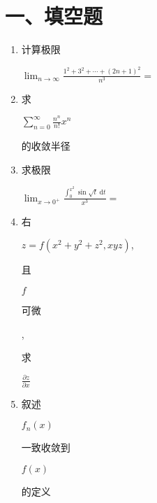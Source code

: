 \documentclass[10pt]{article}
\begin{document}
\section{一、填空题}
\begin{enumerate}
  \item \begin{CJK}{UTF8}{mj}计算极限\end{CJK} $\lim _{n \rightarrow \infty} \frac{1^{2}+3^{2}+\cdots+(2 n+1)^{2}}{n^{3}}=$

  \item \begin{CJK}{UTF8}{mj}求\end{CJK} $\sum_{n=0}^{\infty} \frac{n^{n}}{n !} x^{n}$ \begin{CJK}{UTF8}{mj}的收敛半径\end{CJK}

  \item \begin{CJK}{UTF8}{mj}求极限\end{CJK} $\lim _{x \rightarrow 0^{+}} \frac{\int_{0}^{x^{2}} \sin \sqrt{t} \mathrm{~d} t}{x^{3}}=$

  \item \begin{CJK}{UTF8}{mj}右\end{CJK} $z=f\left(x^{2}+y^{2}+z^{2}, x y z\right)$, \begin{CJK}{UTF8}{mj}且\end{CJK} $f$ \begin{CJK}{UTF8}{mj}可微\end{CJK}, \begin{CJK}{UTF8}{mj}求\end{CJK} $\frac{\partial z}{\partial x}$

  \item \begin{CJK}{UTF8}{mj}叙述\end{CJK} $f_{n}(x)$ \begin{CJK}{UTF8}{mj}一致收敛到\end{CJK} $f(x)$ \begin{CJK}{UTF8}{mj}的定义\end{CJK}

\end{enumerate}
\end{document}
